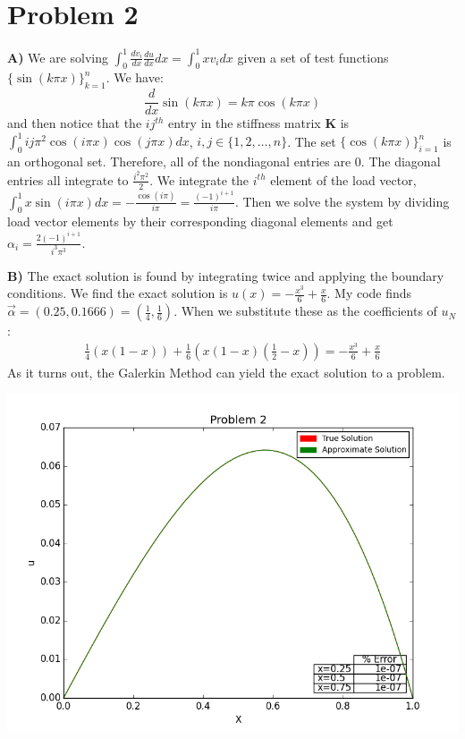 \documentclass[10pt]{article}
\newcommand{\tbf}[1]{\textbf{#1}}
\newcommand{\pl}[2]{\frac{d #1}{d #2}}
\newcommand{\iab}[2]{\int_#1^#2}
\begin{document}
\section*{Problem 2}
\tbf{A)} We are solving $\iab{0}{1}\pl{v_i}{x}\pl{u}{x}dx=\iab{0}{1}xv_i dx$ given a set of test functions $\{\sin(k\pi x)\}_{k=1}^n$. We have: 
\begin{equation*}
\frac{d}{dx}\sin(k\pi x)=k\pi \cos(k\pi x)
\end{equation*}
and then notice that the $ij^{th}$ entry in the stiffness matrix \textbf{K} is $\iab{0}{1}ij\pi^2\cos(i\pi x)\cos(j\pi x)dx$, $i, j\in \{1, 2, \dots, n\}$. The set $\{\cos(k\pi x)\}_{i=1}^n$ is an orthogonal set. Therefore, all of the nondiagonal entries are 0. 
The diagonal entries all integrate to $\frac{i^2\pi^2}2$. We integrate the $i^{th}$ element of the load vector, $\iab{0}{1}x\sin(i\pi x)dx = -\frac{\cos(i\pi)}{i\pi} = \frac{(-1)^{i+1}}{i\pi}$. Then we solve the system by dividing load vector elements by their corresponding diagonal elements and get $\alpha_i=\frac{2(-1)^{i+1}}{i^3\pi^3}$.

\tbf{B)} The exact solution is found by integrating twice and applying the boundary conditions. We find the exact solution is $u(x) = -\frac{x^3}{6}+\frac{x}{6}$. My code finds $\vec{\alpha} = (0.25, 0.1666) = (\frac14, \frac16)$. When we substitute these as the coefficients of $u_N$:
\begin{gather*}
\frac14(x(1-x)) + \frac16(x(1-x)(\frac12 - x))=-\frac{x^3}{6}+\frac{x}{6}
\end{gather*}
As it turns out, the Galerkin Method can yield the exact solution to a problem.
\begin{center}
\includegraphics[scale=0.4]{two_poly_p2.png}
\end{center}
\end{document}
